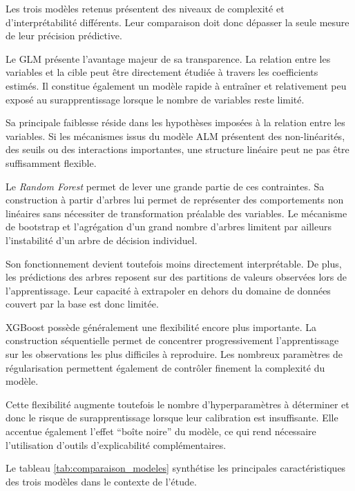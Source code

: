 Les trois modèles retenus présentent des niveaux de complexité et d'interprétabilité différents. Leur comparaison doit donc dépasser la seule mesure de leur précision prédictive.

Le GLM présente l'avantage majeur de sa transparence. La relation entre les variables et la cible peut être directement étudiée à travers les coefficients estimés. Il constitue également un modèle rapide à entraîner et relativement peu exposé au surapprentissage lorsque le nombre de variables reste limité.

Sa principale faiblesse réside dans les hypothèses imposées à la relation entre les variables. Si les mécanismes issus du modèle ALM présentent des non-linéarités, des seuils ou des interactions importantes, une structure linéaire peut ne pas être suffisamment flexible.

Le \textit{Random Forest} permet de lever une grande partie de ces contraintes. Sa construction à partir d'arbres lui permet de représenter des comportements non linéaires sans nécessiter de transformation préalable des variables. Le mécanisme de bootstrap et l'agrégation d'un grand nombre d'arbres limitent par ailleurs l'instabilité d'un arbre de décision individuel.

Son fonctionnement devient toutefois moins directement interprétable. De plus, les prédictions des arbres reposent sur des partitions de valeurs observées lors de l'apprentissage. Leur capacité à extrapoler en dehors du domaine de données couvert par la base est donc limitée.

XGBoost possède généralement une flexibilité encore plus importante. La construction séquentielle permet de concentrer progressivement l'apprentissage sur les observations les plus difficiles à reproduire. Les nombreux paramètres de régularisation permettent également de contrôler finement la complexité du modèle.

Cette flexibilité augmente toutefois le nombre d'hyperparamètres à déterminer et donc le risque de surapprentissage lorsque leur calibration est insuffisante. Elle accentue également l'effet ``boîte noire'' du modèle, ce qui rend nécessaire l'utilisation d'outils d'explicabilité complémentaires.

Le tableau \ref{tab:comparaison_modeles} synthétise les principales caractéristiques des trois modèles dans le contexte de l'étude.

